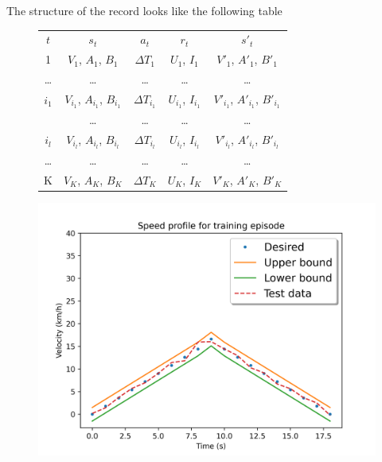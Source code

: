 \documentclass{article}
\begin{document}
The structure of the record looks like the following table


\begin{figure}
	\begin{minipage}[b]{0.45\linewidth}
		\centering
		\begin{tabular}{c c c c c}
			\toprule
			$t$     & $s_{t}$                               & $a_t$              & $r_t$                    & $s'_t$                                   \\
			\cmidrule(r){1-1} \cmidrule(r){2-4} \cmidrule{5-5}
			1       & $V_1$, $A_1$, $B_1$                   & $\Delta T_{1}$     & $U_{1}$, $I_{1}$         & $V'_1$, $A'_1$, $B'_1$                   \\
			\ldots  & \ldots                                & \ldots             & \ldots                   & \ldots                                   \\
			$i_{1}$ & $V_{i_{1}}$, $A_{i_{1}}$, $B_{i_{1}}$ & $\Delta T_{i_{1}}$ & $U_{i_{1}}$, $I_{i_{1}}$ & $V'_{i_{1}}$, $A'_{i_{1}}$, $B'_{i_{1}}$ \\
			        & \ldots                                & \ldots             & \ldots                   & \ldots                                   \\
			$i_{l}$ & $V_{i_{l}}$, $A_{i_l}$, $B_{i_l}$     & $\Delta T_{i_{l}}$ & $U_{i_{l}}$, $I_{i_{l}}$ & $V'_{i_{l}}$, $A'_{i_{l}}$, $B'_{i_{l}}$ \\
			\ldots  & \ldots                                & \ldots             & \ldots                   & \ldots                                   \\
			K       & $V_K$, $A_K$, $B_K$                   & $\Delta T_{K}$     & $U_K$, $I_K$             & $V'_K$, $A'_K$, $B'_K$                   \\
			\bottomrule
		\end{tabular}
	\end{minipage}\hfill
	\begin{minipage}[b]{0.45\linewidth}
		\centering
		\includegraphics[scale=0.5]{images/speed_profile.png}
	\end{minipage}
\end{figure}
\end{document}
